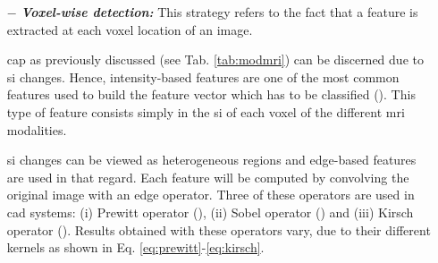 \begin{enumerate}[leftmargin=*]

\item[$-$] \textbf{\textit{Voxel-wise detection:}} This strategy refers to the fact that a feature is extracted at each voxel location of an image.

\ac{cap} as previously discussed (see Tab. \ref{tab:modmri}) can be discerned due to \ac{si} changes. Hence, intensity-based features are one of the most common features used to build the feature vector which has to be classified (\cite{Ampeliotis2007,Ampeliotis2008,Artan2009,Artan2010,Chan2003,Langer2009,Liu2009,Niaf2011,Niaf2012,Viswanath2008a,Viswanath2011}). This type of feature consists simply in the \ac{si} of each voxel of the different \ac{mri} modalities.

\Ac{si} changes can be viewed as heterogeneous regions and edge-based features are used in that regard. Each feature will be computed by convolving the original image with an edge operator. Three of these operators are used in \ac{cad} systems: (i) Prewitt operator (\cite{Prewitt1970}), (ii) Sobel operator (\cite{Sobel1970}) and (iii) Kirsch operator (\cite{Kirsch1971}). Results obtained with these operators vary, due to their different kernels as shown in Eq. \ref{eq:prewitt}-\ref{eq:kirsch}.


\end{enumerate}
